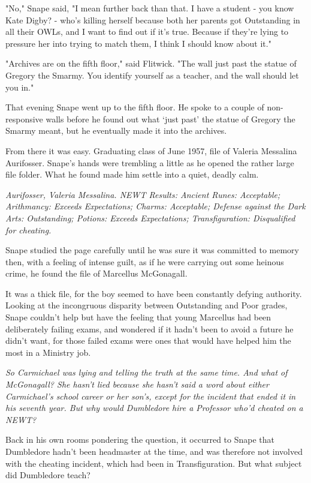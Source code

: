 "No," Snape said, "I mean further back than that. I have a student - you know Kate Digby? - who's killing herself because both her parents got Outstanding in all their OWLs, and I want to find out if it's true. Because if they're lying to pressure her into trying to match them, I think I should know about it."

"Archives are on the fifth floor," said Flitwick. "The wall just past the statue of Gregory the Smarmy. You identify yourself as a teacher, and the wall should let you in."

That evening Snape went up to the fifth floor. He spoke to a couple of non-responsive walls before he found out what `just past' the statue of Gregory the Smarmy meant, but he eventually made it into the archives.

From there it was easy. Graduating class of June 1957, file of Valeria Messalina Aurifosser. Snape's hands were trembling a little as he opened the rather large file folder. What he found made him settle into a quiet, deadly calm.

\emph{Aurifosser, Valeria Messalina. NEWT Results: Ancient Runes: Acceptable; Arithmancy: Exceeds Expectations; Charms: Acceptable; Defense against the Dark Arts: Outstanding; Potions: Exceeds Expectations; Transfiguration: Disqualified for cheating.}

Snape studied the page carefully until he was sure it was committed to memory then, with a feeling of intense guilt, as if he were carrying out some heinous crime, he found the file of Marcellus McGonagall.

It was a thick file, for the boy seemed to have been constantly defying authority. Looking at the incongruous disparity between Outstanding and Poor grades, Snape couldn't help but have the feeling that young Marcellus had been deliberately failing exams, and wondered if it hadn't been to avoid a future he didn't want, for those failed exams were ones that would have helped him the most in a Ministry job.

\emph{So Carmichael was lying and telling the truth at the same time. And what of McGonagall? She hasn't lied because she hasn't said a word about either Carmichael's school career or her son's, except for the incident that ended it in his seventh year. But why would Dumbledore hire a Professor who'd cheated on a NEWT?}

Back in his own rooms pondering the question, it occurred to Snape that Dumbledore hadn't been headmaster at the time, and was therefore not involved with the cheating incident, which had been in Transfiguration. But what subject did Dumbledore teach?

